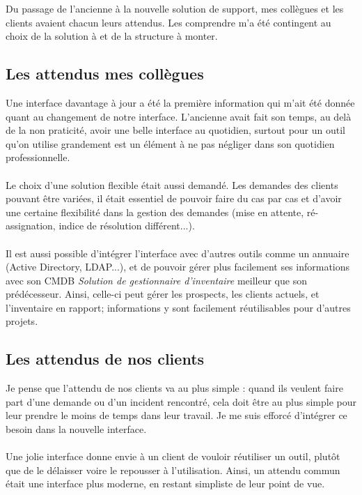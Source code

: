 Du passage de l'ancienne à la nouvelle solution de support, mes collègues et les clients avaient chacun leurs attendus. Les comprendre m'a été contingent au choix de la solution à et de la structure à monter.

\subsection{Les attendus mes collègues}

Une interface davantage à jour a été la première information qui m'ait été donnée quant au changement de notre interface. L'ancienne avait fait son temps, au delà de la non praticité, avoir une belle interface au quotidien, surtout pour un outil qu'on utilise grandement est un élément à ne pas négliger dans son quotidien professionnelle. 
\\ \\
Le choix d'une solution flexible était aussi demandé. Les demandes des clients pouvant être variées, il était essentiel de pouvoir faire du cas par cas et d'avoir une certaine flexibilité dans la gestion des demandes (mise en attente, ré-assignation, indice de résolution différent...).
\\ \\
Il est aussi possible d'intégrer l'interface avec d'autres outils comme un annuaire (Active Directory, LDAP...), et de pouvoir gérer plus facilement ses informations avec son CMDB \textit{Solution de gestionnaire d'inventaire} meilleur que son prédécesseur. Ainsi, celle-ci peut gérer les prospects, les clients actuels, et l'inventaire en rapport; informations y sont facilement réutilisables pour d'autres projets.

\subsection{Les attendus de nos clients}

Je pense que l'attendu de nos clients va au plus simple : quand ils veulent faire part d'une demande ou d'un incident rencontré, cela doit être au plus simple pour leur prendre le moins de temps dans leur travail. Je me suis efforcé d'intégrer ce besoin dans la nouvelle interface.
\\ \\
Une jolie interface donne envie à un client de vouloir réutiliser un outil, plutôt que de le délaisser voire le repousser à l'utilisation. Ainsi, un attendu commun était une interface plus moderne, en restant simpliste de leur point de vue.


